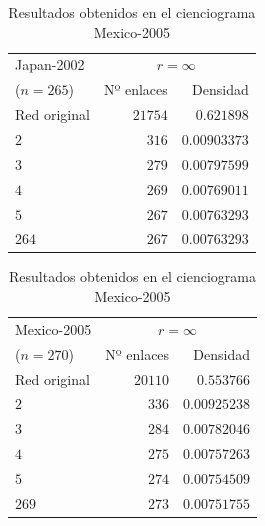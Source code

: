 \documentclass[10pt,a4paper,spanish]{article}
\numberwithin{equation}{section} %
\numberwithin{figure}{section} %
\numberwithin{table}{section} %
\begin{document}
\begin{table}[!h]
\begin{minipage}{0.5\textwidth}
\centering
\begin{tabular}{lrr}
\hline
 Japan-2002 & \multicolumn{2}{c}{$r = \infty$} \\
($n=265$)   &   Nº enlaces &    Densidad \\
\hline
 Red original             &               $21754$ & $0.621898$ \\
 $2$                        &                 $316$ & $0.00903373$  \\
 $3$                        &                 $279$ & $0.00797599$  \\
 $4$                        &                 $269$ & $0.00769011$  \\
 $5$                        &                 $267$ & $0.00763293$   \\
 $264$                      &                 $267$ & $0.00763293$   \\
\hline
\end{tabular}
\caption{Resultados obtenidos en el cienciograma Japan-2002}
\label{japan2002}
\end{minipage}
\begin{minipage}{0.5\textwidth}
\centering
\begin{tabular}{lrr}
\hline
 Mexico-2005 & \multicolumn{2}{c}{$r = \infty$} \\
($n=270$)   &   Nº enlaces &   Densidad \\
\hline
 Red original              &               $20110$ & $0.553766$ \\
 $2$                         &                 $336$ & $0.00925238$ \\
 $3$                         &                 $284$ & $0.00782046$ \\
 $4$                         &                 $275$ & $0.00757263$ \\
 $5$                         &                 $274$ & $0.00754509$ \\
 $269$                       &                 $273$ & $0.00751755$ \\
\hline
\end{tabular}
\caption{Resultados obtenidos en el cienciograma Mexico-2005}
\label{mexico2005}
\end{minipage}
\end{table}
\end{document}
